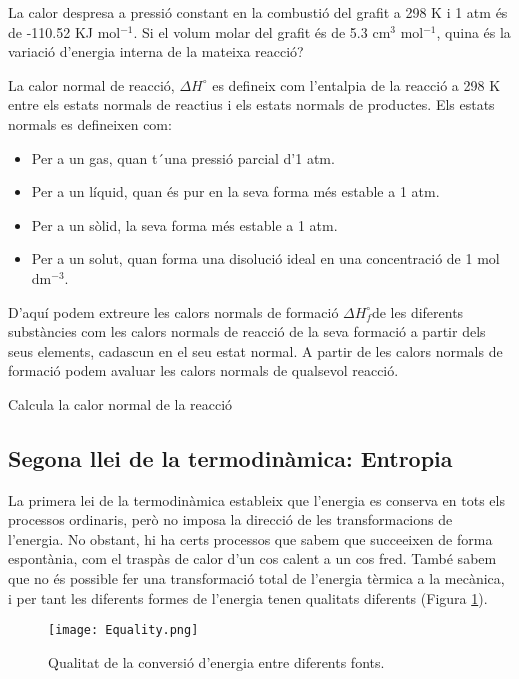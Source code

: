 \begin{exr}
La calor despresa a pressió constant en la combustió del grafit a 298 K i 1 atm és de -110.52 KJ mol$^{-1}$. Si el volum molar del grafit és de 5.3 cm$^3$ mol$^{-1}$, quina és la variació d'energia interna de la mateixa reacció?
\end{exr}

La calor normal de reacció, $\Delta H^{\circ}$ es defineix com l'entalpia de la reacció a 298 K entre els estats normals de reactius i els estats normals de productes.
Els estats normals es defineixen com:
\begin{itemize}
\item Per a un gas, quan t´una pressió parcial d'1 atm.
\item Per a un líquid, quan és pur en la seva forma més estable a 1 atm.
\item Per a un sòlid, la seva forma més estable a 1 atm.
\item Per a un solut, quan forma una disolució ideal en una concentració de 1 mol dm$^{-3}$.
\end{itemize}
D'aquí podem extreure les calors normals de formació $\Delta H_f^{\circ}$de les diferents substàncies com les calors normals de reacció de la seva formació a partir dels seus elements, cadascun en el seu estat normal.
A partir de les calors normals de formació podem avaluar les calors normals de qualsevol reacció.
\begin{exr}
Calcula la calor normal de la reacció 
\end{exr}

\subsection{Segona llei de la termodinàmica: Entropia}

La primera lei de la termodinàmica estableix que l'energia es conserva en tots els processos ordinaris, però no imposa la direcció de les transformacions de l'energia.
No obstant, hi ha certs processos que sabem que succeeixen de forma espontània, com el traspàs de calor d'un cos calent a un cos fred.
També sabem que no és possible fer una transformació total de l'energia tèrmica a la mecànica, i per tant les diferents formes de l'energia tenen qualitats diferents (Figura \ref{fig:Equality}).
\begin{figure}[h]
\centering
\texttt{[image: Equality.png]}
\caption{Qualitat de la conversió d'energia entre diferents fonts.\citep{yen_chemistry_2008}}
\label{fig:Equality}
\end{figure}


